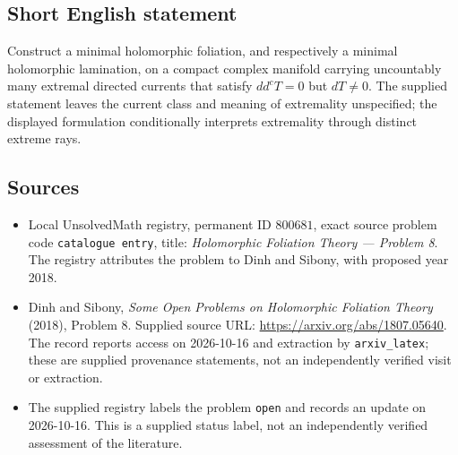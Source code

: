 \documentclass[11pt]{article}
\begin{document}
\subsection{Short English statement}
Construct a minimal holomorphic foliation, and respectively a minimal holomorphic lamination, on a compact complex manifold carrying uncountably many extremal directed currents that satisfy \(dd^cT=0\) but \(dT\ne0\). The supplied statement leaves the current class and meaning of extremality unspecified; the displayed formulation conditionally interprets extremality through distinct extreme rays.
\subsection{Sources}
\begin{itemize}
\item Local UnsolvedMath registry, permanent ID \(800681\), exact source problem code \texttt{catalogue entry}, title: \emph{Holomorphic Foliation Theory --- Problem 8}. The registry attributes the problem to Dinh and Sibony, with proposed year 2018.
\item Dinh and Sibony, \emph{Some Open Problems on Holomorphic Foliation Theory} (2018), Problem 8. Supplied source URL: \url{https://arxiv.org/abs/1807.05640}. The record reports access on 2026-10-16 and extraction by \texttt{arxiv\_latex}; these are supplied provenance statements, not an independently verified visit or extraction.
\item The supplied registry labels the problem \texttt{open} and records an update on 2026-10-16. This is a supplied status label, not an independently verified assessment of the literature.
\end{itemize}
\end{document}
